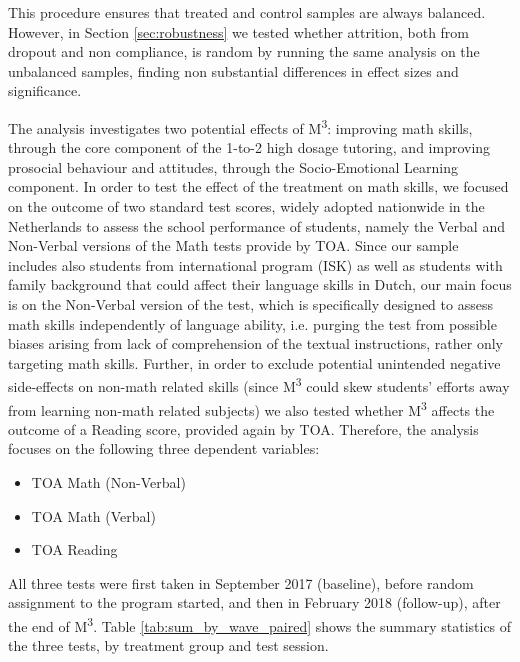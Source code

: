 \documentclass[ 12 pt]{article}
\begin{document}
This procedure ensures that treated and control samples are always balanced. However, in Section \ref{sec:robustness} we tested whether attrition, both from dropout and non compliance, is random by running the same analysis on the unbalanced samples, finding non substantial differences in effect sizes and significance.


%


% 
% 

The analysis investigates two potential effects of M\textsuperscript{3}: improving math skills, through the core component of the 1-to-2 high dosage tutoring, and improving prosocial behaviour and attitudes, through the Socio-Emotional Learning component.
In order to test the effect of the treatment on math skills, we focused on the outcome of two standard test scores, widely adopted nationwide in the Netherlands to assess the school performance of students, namely the Verbal and Non-Verbal versions of the Math tests provide by TOA. Since our sample includes also students from international program (ISK) as well as students with family background that could affect their language skills in Dutch, our main focus is on the Non-Verbal version of the test, which is specifically designed to assess math skills independently of language ability, i.e. purging the test from possible biases arising from lack of comprehension of the textual instructions, rather only targeting math skills. Further, in order to exclude potential unintended negative side-effects on non-math related skills (since M\textsuperscript{3} could skew students' efforts away from learning non-math related subjects) we also tested whether M\textsuperscript{3} affects the outcome of a Reading score, provided again by TOA. Therefore, the analysis focuses on the following three dependent variables:
\begin{itemize}
\item TOA Math (Non-Verbal)
\item TOA Math (Verbal)
\item TOA Reading
\end{itemize}

All three tests were first taken in September 2017 (baseline), before random assignment to the program started, and then in February 2018 (follow-up), after the end of M\textsuperscript{3}. Table \ref{tab:sum_by_wave_paired} shows the summary statistics of the three tests, by treatment group and test session.
\end{document}
